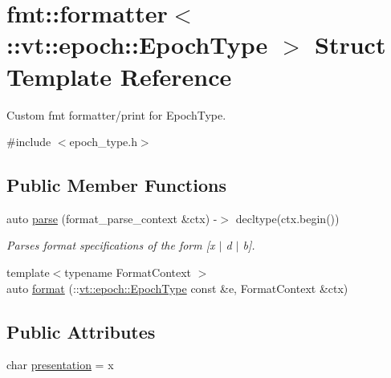\hypertarget{structfmt_1_1formatter_3_1_1vt_1_1epoch_1_1_epoch_type_01_4}{}\section{fmt\+:\+:formatter$<$\+:\+:vt\+:\+:epoch\+:\+:Epoch\+Type $>$ Struct Template Reference}
\label{structfmt_1_1formatter_3_1_1vt_1_1epoch_1_1_epoch_type_01_4}


Custom fmt formatter/print for {\ttfamily Epoch\+Type}.  




{\ttfamily \#include $<$epoch\+\_\+type.\+h$>$}

\subsection*{Public Member Functions}
\begin{DoxyCompactItemize}
\item 
auto \hyperlink{structfmt_1_1formatter_3_1_1vt_1_1epoch_1_1_epoch_type_01_4_ac358b7f617248c72cd9e7cc77f622cdd}{parse} (format\+\_\+parse\+\_\+context \&ctx) -\/$>$ decltype(ctx.\+begin())
\begin{DoxyCompactList}\small\item\em Parses format specifications of the form \mbox{[}\textquotesingle{}x\textquotesingle{} $\vert$ \textquotesingle{}d\textquotesingle{} $\vert$ \textquotesingle{}b\textquotesingle{}\mbox{]}. \end{DoxyCompactList}\item 
{\footnotesize template$<$typename Format\+Context $>$ }\\auto \hyperlink{structfmt_1_1formatter_3_1_1vt_1_1epoch_1_1_epoch_type_01_4_a34449dc509ad77ff399c20dbd66646fc}{format} (\+::\hyperlink{structvt_1_1epoch_1_1_epoch_type}{vt\+::epoch\+::\+Epoch\+Type} const \&e, Format\+Context \&ctx)
\end{DoxyCompactItemize}
\subsection*{Public Attributes}
\begin{DoxyCompactItemize}
\item 
char \hyperlink{structfmt_1_1formatter_3_1_1vt_1_1epoch_1_1_epoch_type_01_4_adbbd56e88fa7fa5151ed77bbc9b66895}{presentation} = \textquotesingle{}x\textquotesingle{}
\end{DoxyCompactItemize}


